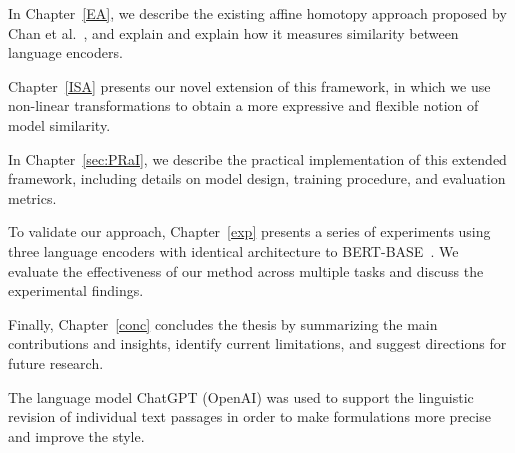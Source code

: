 In Chapter~\ref{EA}, we describe the existing affine homotopy approach proposed by Chan et al.~\cite{chan_affine_2024}, and explain and explain how it measures similarity between language encoders.

Chapter~\ref{ISA} presents our novel extension of this framework, in which we use non-linear transformations to obtain a more expressive and flexible notion of model similarity.

In Chapter~\ref{sec:PRaI}, we describe the practical implementation of this extended framework, including details on model design, training procedure, and evaluation metrics.

To validate our approach, Chapter~\ref{exp} presents a series of experiments using three language encoders with identical architecture to BERT-BASE~\cite{BERT}. %
We evaluate the effectiveness of our method across multiple tasks and discuss the experimental findings.

Finally, Chapter~\ref{conc} concludes the thesis by summarizing the main contributions and insights, identify current limitations, and suggest directions for future research.

The language model ChatGPT (OpenAI) was used to support the linguistic revision of individual text passages in order to make formulations more precise and improve the style.